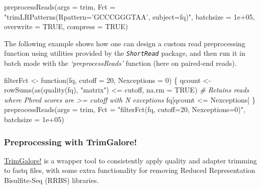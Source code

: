 \documentclass[14pt,]{article}
\newcommand{\hlnum}[1]{\textcolor[rgb]{0.816,0.125,0.439}{#1}}%
\newcommand{\hlstr}[1]{\textcolor[rgb]{0.251,0.627,0.251}{#1}}%
\newcommand{\hlcom}[1]{\textcolor[rgb]{0.502,0.502,0.502}{\textit{#1}}}%
\newcommand{\hlopt}[1]{\textcolor[rgb]{0,0,0}{#1}}%
\newcommand{\hlstd}[1]{\textcolor[rgb]{0.251,0.251,0.251}{#1}}%
\newcommand{\hlkwc}[1]{\textcolor[rgb]{0.251,0.251,0.251}{#1}}%
\newcommand{\hlkwd}[1]{\textcolor[rgb]{0.878,0.439,0.125}{#1}}%
\newenvironment{Shaded}{\begin{myshaded}}{\end{myshaded}}
\newcommand{\KeywordTok}[1]{\hlkwd{#1}}
\newcommand{\DataTypeTok}[1]{\hlkwc{#1}}
\newcommand{\DecValTok}[1]{\hlnum{#1}}
\newcommand{\FloatTok}[1]{\hlnum{#1}}
\newcommand{\StringTok}[1]{\hlstr{#1}}
\newcommand{\CommentTok}[1]{\hlcom{#1}}
\newcommand{\OtherTok}[1]{{#1}}
\newcommand{\ControlFlowTok}[1]{\hlkwd{#1}}
\newcommand{\OperatorTok}[1]{\hlopt{#1}}
\newcommand{\NormalTok}[1]{\hlstd{#1}}
\begin{document}
\begin{Shaded}
\begin{Highlighting}[]
\KeywordTok{preprocessReads}\NormalTok{(}\DataTypeTok{args =}\NormalTok{ trim, }\DataTypeTok{Fct =} \StringTok{"trimLRPatterns(Rpattern='GCCCGGGTAA', }
\StringTok{                subject=fq)"}\NormalTok{, }
    \DataTypeTok{batchsize =} \FloatTok{1e+05}\NormalTok{, }\DataTypeTok{overwrite =} \OtherTok{TRUE}\NormalTok{, }\DataTypeTok{compress =} \OtherTok{TRUE}\NormalTok{)}
\end{Highlighting}
\end{Shaded}

The following example shows how one can design a custom read preprocessing function
using utilities provided by the \emph{\texttt{ShortRead}} package, and then run it
in batch mode with the \emph{`preprocessReads'} function (here on paired-end reads).

\begin{Shaded}
\begin{Highlighting}[]
\NormalTok{filterFct <-}\StringTok{ }\ControlFlowTok{function}\NormalTok{(fq, }\DataTypeTok{cutoff =} \DecValTok{20}\NormalTok{, }\DataTypeTok{Nexceptions =} \DecValTok{0}\NormalTok{) \{}
\NormalTok{    qcount <-}\StringTok{ }\KeywordTok{rowSums}\NormalTok{(}\KeywordTok{as}\NormalTok{(}\KeywordTok{quality}\NormalTok{(fq), }\StringTok{"matrix"}\NormalTok{) }\OperatorTok{<=}\StringTok{ }\NormalTok{cutoff, }\DataTypeTok{na.rm =} \OtherTok{TRUE}\NormalTok{)}
    \CommentTok{# Retains reads where Phred scores are >= cutoff with N exceptions}
\NormalTok{    fq[qcount }\OperatorTok{<=}\StringTok{ }\NormalTok{Nexceptions]}
\NormalTok{\}}
\KeywordTok{preprocessReads}\NormalTok{(}\DataTypeTok{args =}\NormalTok{ trim, }\DataTypeTok{Fct =} \StringTok{"filterFct(fq, cutoff=20, Nexceptions=0)"}\NormalTok{, }\DataTypeTok{batchsize =} \FloatTok{1e+05}\NormalTok{)}
\end{Highlighting}
\end{Shaded}

\hypertarget{preprocessing-with-trimgalore}{%
\subsubsection{Preprocessing with TrimGalore!}\label{preprocessing-with-trimgalore}}

\href{http://www.bioinformatics.babraham.ac.uk/projects/trim_galore/}{TrimGalore!} is
a wrapper tool to consistently apply quality and adapter trimming to fastq files,
with some extra functionality for removing Reduced Representation Bisulfite-Seq
(RRBS) libraries.
\end{document}
